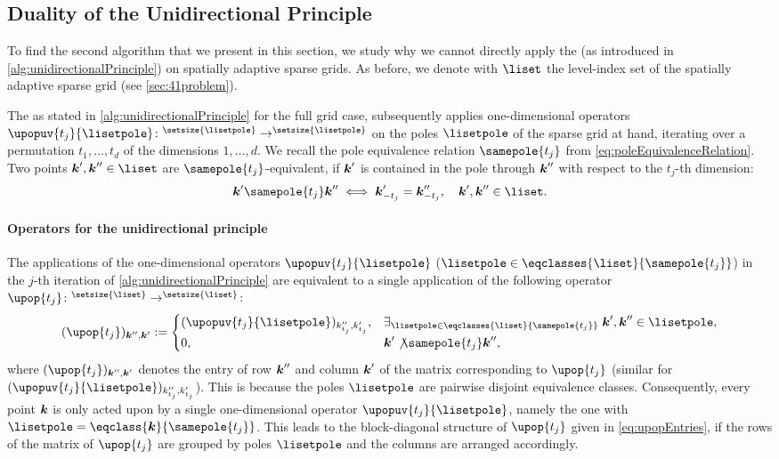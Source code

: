 \subsection{Duality of the Unidirectional Principle}
\label{sec:452duality}

To find the second algorithm that we present in this section,
we study why we cannot directly apply the \up
(as introduced in \cref{alg:unidirectionalPrinciple})
on spatially adaptive sparse grids.
As before, we denote with $\liset$ the level-index set of
the spatially adaptive sparse grid (see \cref{sec:41problem}).

The \up\punctfix{,} as stated in
\cref{alg:unidirectionalPrinciple} for the full grid case,
subsequently applies one-dimensional operators
$\upopuv{t_j}{\lisetpole}\colon \real^{\setsize{\lisetpole}} \to
\real^{\setsize{\lisetpole}}$
on the poles $\lisetpole$ of the sparse grid at hand,
iterating over a permutation $t_1, \dotsc, t_d$
of the dimensions $1, \dotsc, d$.
We recall the pole equivalence relation $\samepole{t_j}$
from \cref{eq:poleEquivalenceRelation}.
Two points $\*k', \*k'' \in \liset$ are $\samepole{t_j}$-equivalent,
if ${\boldsymbol{k}}'$ is contained in the pole through ${\boldsymbol{k}}''$
with respect to the $t_j$-th dimension:
\begin{equation}
  \*k' \samepole{t_j} \*k'' \iff \*k'_{-t_j} = \*k''_{-t_j},\quad
  \*k', \*k'' \in \liset.
\end{equation}

\paragraph{Operators for the unidirectional principle}

The applications of the one-dimensional operators
$\upopuv{t_j}{\lisetpole}$
($\lisetpole \in \eqclasses{\liset}{\samepole{t_j}}$)
in the $j$-th iteration of \cref{alg:unidirectionalPrinciple}
are equivalent to a single application of the following operator
$\upop{t_j}\colon \real^{\setsize{\liset}} \to \real^{\setsize{\liset}}$:
\begin{equation}
  \label{eq:upopEntries}
  (\upop{t_j})_{\*k'',\*k'}
  :=
  \begin{cases}
    (\upopuv{t_j}{\lisetpole})_{k''_{t_j},k'_{t_j}},&
    \ex{\lisetpole \in \eqclasses{\liset}{\samepole{t_j}}}{
      \*k', \*k'' \in \lisetpole
    },\\
    0,&\*k' \not\samepole{t_j} \*k'',
  \end{cases}
\end{equation}
where $(\upop{t_j})_{\*k'',\*k'}$ denotes the entry of row ${\boldsymbol{k}}''$
and column ${\boldsymbol{k}}'$ of the matrix corresponding to $\upop{t_j}$
(similar for $(\upopuv{t_j}{\lisetpole})_{k''_{t_j},k'_{t_j}}$).
This is because the poles $\lisetpole$ are pairwise disjoint
equivalence classes.
Consequently, every point ${\boldsymbol{k}}$ is only acted upon by a single
one-dimensional operator $\upopuv{t_j}{\lisetpole}$,
namely the one with $\lisetpole = \eqclass{\*k}{\samepole{t_j}}$.
This leads to the block-diagonal structure
of $\upop{t_j}$ given in \eqref{eq:upopEntries},
if the rows of the matrix of $\upop{t_j}$
are grouped by poles $\lisetpole$ and the columns are arranged accordingly.

